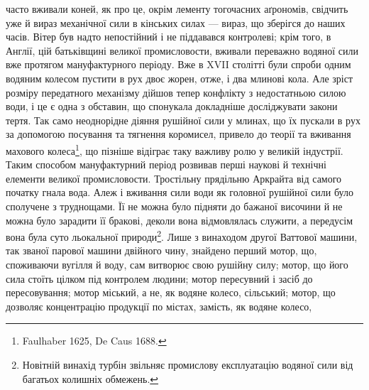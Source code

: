 \parcont{}  %
часто вживали коней, як про це, окрім лементу тогочасних аґрономів,
свідчить уже й вираз механічної сили в кінських силах —
вираз, що зберігся до наших часів. Вітер був надто непостійний
і не піддавався контролеві; крім того, в Англії, цій батьківщині
великої промисловости, вживали переважно водяної сили вже
протягом мануфактурного періоду. Вже в XVII столітті були
спроби одним водяним колесом пустити в рух двоє жорен, отже, і
два млинові кола. Але зріст розміру передатного механізму дійшов
тепер конфлікту з недостатньою силою води, і це є одна з обставин,
що спонукала докладніше досліджувати закони тертя. Так
само неоднорідне діяння рушійної сили у млинах, що їх пускали
в рух за допомогою посування та тягнення коромисел, привело
до теорії та вживання махового колеса\footnote{
Faulhaber 1625, De Caus 1688.
}, що пізніше відіграє
таку важливу ролю у великій індустрії. Таким способом мануфактурний
період розвивав перші наукові й технічні елементи
великої промисловости. Тростільну прядільню Аркрайта від
самого початку гнала вода. Алеж і вживання сили води як
головної рушійної сили було сполучене з труднощами. Її не можна
було підняти до бажаної височини й не можна було зарадити її
бракові, деколи вона відмовлялась служити, а передусім вона
була суто льокальної природи\footnote{
Новітній винахід турбін звільняє промислову експлуатацію
водяної сили від багатьох колишніх обмежень.
}. Лише з винаходом другої Ваттової
машини, так званої парової машини двійного чину, знайдено
перший мотор, що, споживаючи вугілля й воду, сам витворює
свою рушійну силу; мотор, що його сила стоїть цілком під контролем
людини; мотор пересувний і засіб до пересовування; мотор
міський, а не, як водяне колесо, сільський; мотор, що дозволяє
концентрацію продукції по містах, замість, як водяне колесо,
